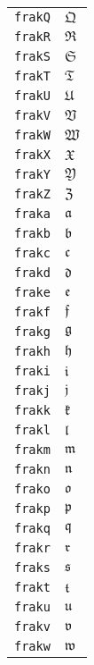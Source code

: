 \begin{longtable}{ll}
\texttt{frakQ}&${}{\mathfrak{Q}} {}$\\
\texttt{frakR}&${}{\mathfrak{R}} {}$\\
\texttt{frakS}&${}{\mathfrak{S}} {}$\\
\texttt{frakT}&${}{\mathfrak{T}} {}$\\
\texttt{frakU}&${}{\mathfrak{U}} {}$\\
\texttt{frakV}&${}{\mathfrak{V}} {}$\\
\texttt{frakW}&${}{\mathfrak{W}} {}$\\
\texttt{frakX}&${}{\mathfrak{X}} {}$\\
\texttt{frakY}&${}{\mathfrak{Y}} {}$\\
\texttt{frakZ}&${}{\mathfrak{Z}} {}$\\
\texttt{fraka}&${}{\mathfrak{a}} {}$\\
\texttt{frakb}&${}{\mathfrak{b}} {}$\\
\texttt{frakc}&${}{\mathfrak{c}} {}$\\
\texttt{frakd}&${}{\mathfrak{d}} {}$\\
\texttt{frake}&${}{\mathfrak{e}} {}$\\
\texttt{frakf}&${}{\mathfrak{f}} {}$\\
\texttt{frakg}&${}{\mathfrak{g}} {}$\\
\texttt{frakh}&${}{\mathfrak{h}} {}$\\
\texttt{fraki}&${}{\mathfrak{i}} {}$\\
\texttt{frakj}&${}{\mathfrak{j}} {}$\\
\texttt{frakk}&${}{\mathfrak{k}} {}$\\
\texttt{frakl}&${}{\mathfrak{l}} {}$\\
\texttt{frakm}&${}{\mathfrak{m}} {}$\\
\texttt{frakn}&${}{\mathfrak{n}} {}$\\
\texttt{frako}&${}{\mathfrak{o}} {}$\\
\texttt{frakp}&${}{\mathfrak{p}} {}$\\
\texttt{frakq}&${}{\mathfrak{q}} {}$\\
\texttt{frakr}&${}{\mathfrak{r}} {}$\\
\texttt{fraks}&${}{\mathfrak{s}} {}$\\
\texttt{frakt}&${}{\mathfrak{t}} {}$\\
\texttt{fraku}&${}{\mathfrak{u}} {}$\\
\texttt{frakv}&${}{\mathfrak{v}} {}$\\
\texttt{frakw}&${}{\mathfrak{w}} {}$\\

\end{longtable}

